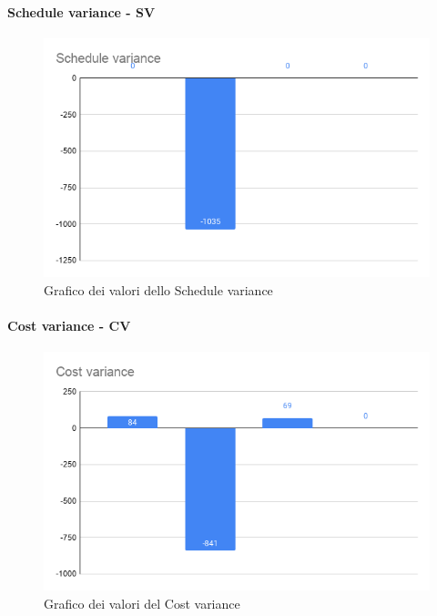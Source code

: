         \paragraph{Schedule variance - SV}

        \begin{figure}[H]
            \centering
            \includegraphics[width=10 cm]{source/sections/images/schedule_variance.png}
            \caption{Grafico dei valori dello Schedule variance}
        \end{figure}

        \paragraph{Cost variance - CV}

        \begin{figure}[H]
            \centering
            \includegraphics[width=10 cm]{source/sections/images/cost_variance.png}
            \caption{Grafico dei valori del Cost variance}
        \end{figure}